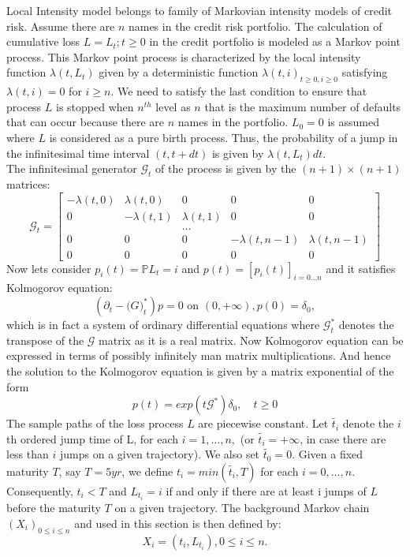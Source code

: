 Local Intensity model belongs to family of Markovian intensity models of credit risk.  Assume there are $n$ names in the credit risk portfolio. The calculation of cumulative loss $L = {L_{t};t \geq 0}$ in the credit portfolio is modeled as a Markov point process. This Markov point process is characterized by the local intensity function $\lambda(t,L_{t})$ given by a deterministic function ${\lambda(t,i)}_{t \geq 0,i \geq 0}$ satisfying $\lambda(t,i) = 0$ for $ i \geq n$. We need to satisfy the last condition to ensure that process $L$ is stopped when $n^{th}$ level as $n$ that is the maximum number of defaults that can occur because there are $n$ names in the portfolio. $L_{0} = 0$ is assumed where $L$ is considered as a pure birth process. Thus, the probability of a jump in the infinitesimal time interval $(t,t+dt)$ is given by $\lambda(t,L_{t})dt$. \\
The infinitesimal generator $\mathcal{G}_{t}$ of the process is given by the $(n+1) \times (n+1)$ matrices: \\
\[\mathcal{G}_{t} = 
	\begin{bmatrix}
-\lambda(t,0)& \lambda(t,0) & 0 & 0 & 0 \\
0 & -\lambda(t,1)& \lambda(t,1)  & 0 & 0 \\
 & &\dots & & \\
 0 & 0 & 0 & -\lambda(t,n-1)& \lambda(t,n-1) \\
 0 & 0 & 0 & 0 & 0
\end{bmatrix}
\]
Now lets consider $p_{i}(t) = \mathbb{P}{L_{t}=i}$ and $p(t) = [p_{i}(t)]_{i=0 \dots n}$ and it satisfies Kolmogorov equation:
\begin{equation}
\left(\partial_{t} - \mathcal(G)_{t}^{*}\right)p = 0 \text{ on } (0,+\infty), p(0) = \delta_{0},
\end{equation} 
which is in fact a system of ordinary differential equations where $\mathcal{G}_{t}^{*}$ denotes the transpose of the $\mathcal{G}$ matrix as it is a real matrix. Now Kolmogorov equation can be expressed in terms of possibly infinitely man matrix multiplications. And hence the solution to the Kolmogorov equation is given by a matrix exponential  of the form \\
\begin{equation}
p(t) = exp(t\mathcal{G}^{*})\delta_{0}, \quad t \geq 0
\end{equation}
The sample paths of the loss process $L$ are piecewise constant. Let $\tilde{t_{i}}$ denote the $i$th ordered jump time of L, for each $i = 1, \dots , n,$ (or $\tilde{t_{i}}  = + \infty$, in case there are less than $i$ jumps on a given trajectory). We also set $\tilde{t_{0}} = 0 $. Given a fixed maturity $T$, say $ T = 5yr$, we define $t_{i} = min(\tilde{t_{i}},T)$ for each $i = 0, \dots, n$. Consequently, $t_{i} < T$ and $L_{t_{i}} = i$ if and only if there are at least i jumps of $L$ before the maturity $T$ on a given trajectory. The background Markov chain $({X_{i}})_{0 \leq i \leq n}$ and used in this section is then defined by: \\
\begin{equation}
X_{i} = (t_{i}, L_{t_{i}}), 0 \leq i \leq n.
\end{equation}
